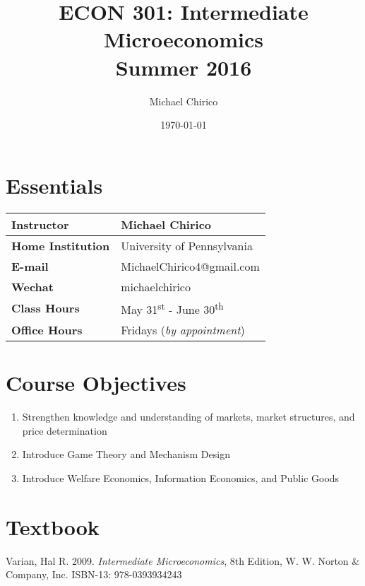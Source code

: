 \documentclass{article}
\begin{document}
\title{ECON 301: Intermediate Microeconomics \\ Summer 2016}

\author{Michael Chirico}

\date{\today}

\maketitle

\section*{Essentials}

\begin{table}[h]
\centering
\begin{tabular}{|l|l|}
\hline
\textbf{Instructor} & Michael Chirico \\
\hline
\textbf{Home Institution} & University of Pennsylvania \\
\hline
\textbf{E-mail} & MichaelChirico4@gmail.com \\
\hline
\textbf{Wechat} & michaelchirico \\
\hline
\textbf{Class Hours} & May 31\textsuperscript{st} - June 30\textsuperscript{th} \\
\hline
\textbf{Office Hours} & Fridays (\textit{by appointment}) \\
\hline
\end{tabular}
\end{table}

\section*{Course Objectives}

\begin{enumerate}
\item Strengthen knowledge and understanding of markets, market structures, and price determination
\item Introduce Game Theory and Mechanism Design
\item Introduce Welfare Economics, Information Economics, and Public Goods
\end{enumerate}

\section*{Textbook}

Varian, Hal R. 2009. \textit{Intermediate Microeconomics}, 8th Edition, W. W. Norton \& Company, Inc. ISBN-13: 978-0393934243
\end{document}
